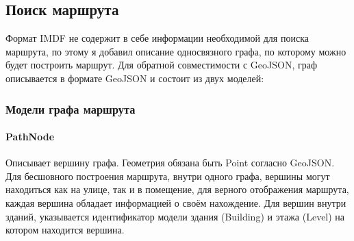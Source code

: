     \subsection{Поиск маршрута}
      Формат IMDF не содержит в себе информации необходимой для поиска маршрута, по этому я добавил описание односвязного графа, по которому можно будет построить маршрут. Для обратной совместимости с GeoJSON, граф описывается в формате GeoJSON и состоит из двух моделей:
      \subsubsection{Модели графа маршрута}
        \paragraph{PathNode}
          Описывает вершину графа. Геометрия обязана быть Point согласно GeoJSON. Для бесшовного построения маршрута, внутри одного графа, вершины могут находиться как на улице, так и в помещение, для верного отображения маршрута, каждая вершина обладает информацией о своём нахождение. Для вершин внутри зданий, указывается идентификатор модели здания (Building) и этажа (Level) на котором находится вершина.
